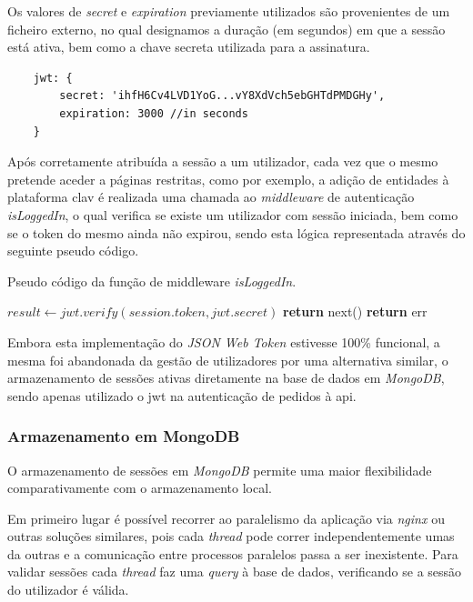 Os valores de \emph{secret} e \emph{expiration} previamente utilizados são provenientes de um ficheiro externo, no qual designamos a duração (em segundos) em que a sessão está ativa, bem como a chave secreta utilizada para a assinatura.

\begin{verbatim}
    jwt: {
        secret: 'ihfH6Cv4LVD1YoG...vY8XdVch5ebGHTdPMDGHy',
        expiration: 3000 //in seconds
    }
\end{verbatim}

Após corretamente atribuída a sessão a um utilizador, cada vez que o mesmo pretende aceder a páginas restritas, como por exemplo, a adição de entidades à plataforma \gls{clav} é realizada uma chamada ao \emph{middleware} de autenticação \emph{isLoggedIn}, o qual verifica se existe um utilizador com sessão iniciada, bem como se o token do mesmo ainda não expirou, sendo esta lógica representada através do seguinte pseudo código.

\begin{algorithm}
    \caption{Pseudo código da função  de middleware \emph{isLoggedIn}.}
    \begin{algorithmic}[1]
        \State $result \gets jwt.verify(session.token, jwt.secret)$
                \State \textbf{return} next()
            \Else
                \State \textbf{return} err
            \EndIf
        \EndIf
    \EndFunction
    \end{algorithmic}
\end{algorithm}

Embora esta implementação do \emph{JSON Web Token} estivesse 100\% funcional, a mesma foi abandonada da gestão de utilizadores por uma alternativa similar, o armazenamento de sessões ativas diretamente na base de dados em \emph{MongoDB}, sendo apenas utilizado o \gls{jwt} na autenticação de pedidos à \gls{api}.

\cleardoublepage
\subsubsection{Armazenamento em MongoDB}

O armazenamento de sessões em \emph{MongoDB} permite uma maior flexibilidade comparativamente com o armazenamento local.

Em primeiro lugar é possível recorrer ao paralelismo da aplicação via \emph{nginx} ou outras soluções similares, pois cada \emph{thread} pode correr independentemente umas da outras e a comunicação entre processos paralelos passa a ser inexistente. Para validar sessões cada \emph{thread} faz uma \emph{query} à base de dados, verificando se a sessão do utilizador é válida.

